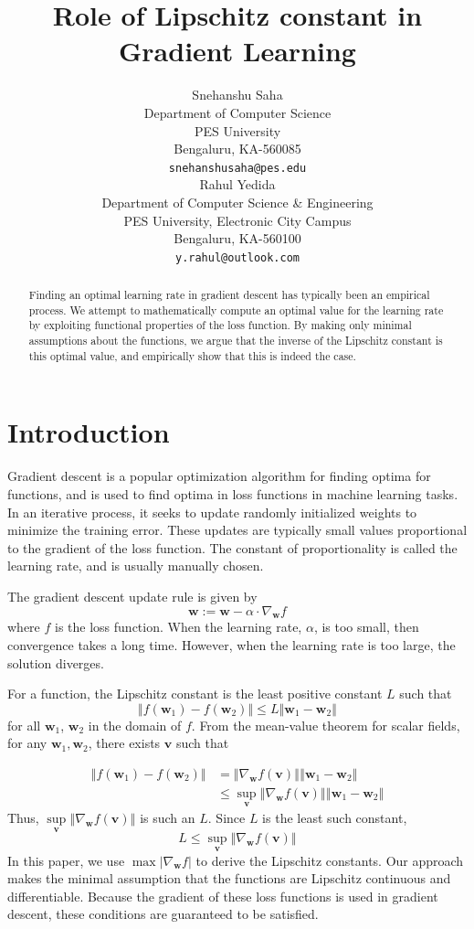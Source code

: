 \documentclass{article}
\title{Role of Lipschitz constant in Gradient Learning}
\author{
        Snehanshu Saha\\
        Department of Computer Science\\
        PES University\\
        Bengaluru, KA-560085\\
        \texttt{snehanshusaha@pes.edu}\\
        \And
        Rahul Yedida\\
        Department of Computer Science \& Engineering \\
        PES University, Electronic City Campus \\
        Bengaluru, KA-560100 \\
        \texttt{y.rahul@outlook.com}
    }
\begin{document}
\maketitle

\begin{abstract}
     Finding an optimal learning rate in gradient descent has typically been an empirical process. We attempt to mathematically compute an optimal value for the learning rate by exploiting functional properties of the loss function. By making only minimal assumptions about the functions, we argue that the inverse of the Lipschitz constant is this optimal value, and empirically show that this is indeed the case.
\end{abstract}

\section{Introduction}
Gradient descent is a popular optimization algorithm for finding optima for functions, and is used to find optima in loss functions in machine learning tasks. In an iterative process, it seeks to update randomly initialized weights to minimize the training error. These updates are typically small values proportional to the gradient of the loss function. The constant of proportionality is called the learning rate, and is usually manually chosen.

The gradient descent update rule is given by
\[
    \textbf{w} := \textbf{w} - \alpha \cdot \nabla_{\textbf{w}} f
\]
where $f$ is the loss function. When the learning rate, $\alpha$, is too small, then convergence takes a long time. However, when the learning rate is too large, the solution diverges. 

For a function, the Lipschitz constant is the least positive constant $L$ such that 
\[
    \left\Vert f(\textbf{w}_1) - f(\textbf{w}_2)\right\Vert \leq L \left\Vert \textbf{w}_1 - \textbf{w}_2 \right\Vert
\]
for all $\textbf{w}_1$, $\textbf{w}_2$ in the domain of $f$. From the mean-value theorem for scalar fields, for any $\textbf{w}_1, \textbf{w}_2$, there exists $\textbf{v}$ such that 

\[
    \begin{aligned}
        \left\Vert f(\textbf{w}_1) - f(\textbf{w}_2) \right\Vert &= \left\Vert \nabla_{\textbf{w}} f(\textbf{v}) \right\Vert \left\Vert \textbf{w}_1-\textbf{w}_2 \right\Vert \\
        &\leq \sup\limits_{\textbf{v}} \left\Vert \nabla_{\textbf{w}} f(\textbf{v}) \right\Vert \left\Vert \textbf{w}_1-\textbf{w}_2 \right\Vert
    \end{aligned}
\]
Thus, $\sup\limits_{\textbf{v}} \left\Vert \nabla_{\textbf{w}} f(\textbf{v}) \right\Vert$ is such an $L$. Since $L$ is the least such constant, 
\[
    L \leq \sup\limits_{\textbf{v}} \left\Vert \nabla_{\textbf{w}} f(\textbf{v}) \right\Vert
\]
In this paper, we use $\max |\nabla_{\textbf{w}} f|$ to derive the Lipschitz constants. Our approach makes the minimal assumption that the functions are Lipschitz continuous and differentiable. Because the gradient of these loss functions is used in gradient descent, these conditions are guaranteed to be satisfied.
\end{document}
